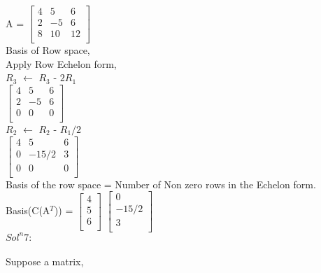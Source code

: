 \documentclass{article}
\begin{document}
A = $\begin{bmatrix}
    4 & 5 & 6\\
    2 & -5 & 6 \\
    8 & 10 & 12  \\
    \end{bmatrix}$ \\

Basis of Row space,\\

Apply Row Echelon form, \\

$R_3$ $\leftarrow$ $R_3$ - $2R_1$\\

$\begin{bmatrix}
    4 & 5 & 6\\
    2 & -5 & 6 \\
    0 & 0 & 0  \\
    \end{bmatrix}$ \\
    
$R_2$ $\leftarrow$ $R_2$ - $R_1/2$\\

$\begin{bmatrix}
    4 & 5 & 6\\
    0 & -15/2 & 3 \\
    0 & 0 & 0  \\
    \end{bmatrix}$ \\
    
Basis of the row space = Number of Non zero rows in the Echelon form. \\

Basis(C(A$^T$)) = $\begin{bmatrix}
    4 \\
    5 \\
    6 \\
    \end{bmatrix}$   $\begin{bmatrix}
    0 \\
    -15/2 \\
    3 \\
    \end{bmatrix}$ \\
    
$Sol^n 7:$ \\ \\ 

Suppose a matrix, \\
\end{document}
